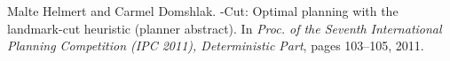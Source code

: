 \begin{thebibliography}{10}
\footnotesize

Malte Helmert and Carmel Domshlak.
-{C}ut: Optimal planning with the landmark-cut heuristic (planner
abstract).
\newblock In {\em Proc. of the Seventh International Planning Competition (IPC
2011), Deterministic Part}, pages 103--105, 2011.
\end{thebibliography}
